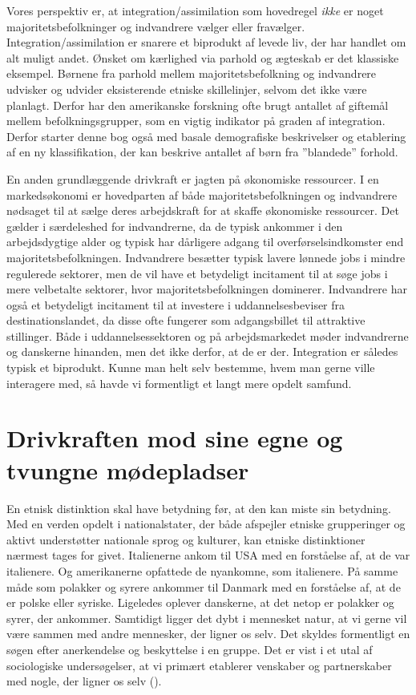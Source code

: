 \documentclass[
]{book}
\begin{document}
Vores perspektiv er, at integration/assimilation som hovedregel \emph{ikke} er noget majoritetsbefolkninger og indvandrere vælger eller fravælger. Integration/assimilation er snarere et biprodukt af levede liv, der har handlet om alt muligt andet. Ønsket om kærlighed via parhold og ægteskab er det klassiske eksempel. Børnene fra parhold mellem majoritetsbefolkning og indvandrere udvisker og udvider eksisterende etniske skillelinjer, selvom det ikke være planlagt. Derfor har den amerikanske forskning ofte brugt antallet af giftemål mellem befolkningsgrupper, som en vigtig indikator på graden af integration. Derfor starter denne bog også med basale demografiske beskrivelser og etablering af en ny klassifikation, der kan beskrive antallet af børn fra ''blandede'' forhold.

En anden grundlæggende drivkraft er jagten på økonomiske ressourcer. I en markedsøkonomi er hovedparten af både majoritetsbefolkningen og indvandrere nødsaget til at sælge deres arbejdskraft for at skaffe økonomiske ressourcer. Det gælder i særdeleshed for indvandrerne, da de typisk ankommer i den arbejdsdygtige alder og typisk har dårligere adgang til overførselsindkomster end majoritetsbefolkningen. Indvandrere besætter typisk lavere lønnede jobs i mindre regulerede sektorer, men de vil have et betydeligt incitament til at søge jobs i mere velbetalte sektorer, hvor majoritetsbefolkningen dominerer. Indvandrere har også et betydeligt incitament til at investere i uddannelsesbeviser fra destinationslandet, da disse ofte fungerer som adgangsbillet til attraktive stillinger. Både i uddannelsessektoren og på arbejdsmarkedet møder indvandrerne og danskerne hinanden, men det ikke derfor, at de er der. Integration er således typisk et biprodukt. Kunne man helt selv bestemme, hvem man gerne ville interagere med, så havde vi formentligt et langt mere opdelt samfund.

\section{Drivkraften mod sine egne og tvungne mødepladser}\label{drivkraften-mod-sine-egne-og-tvungne-muxf8depladser}

En etnisk distinktion skal have betydning før, at den kan miste sin betydning. Med en verden opdelt i nationalstater, der både afspejler etniske grupperinger og aktivt understøtter nationale sprog og kulturer, kan etniske distinktioner nærmest tages for givet. Italienerne ankom til USA med en forståelse af, at de var italienere. Og amerikanerne opfattede de nyankomne, som italienere. På samme måde som polakker og syrere ankommer til Danmark med en forståelse af, at de er polske eller syriske. Ligeledes oplever danskerne, at det netop er polakker og syrer, der ankommer. Samtidigt ligger det dybt i mennesket natur, at vi gerne vil være sammen med andre mennesker, der ligner os selv. Det skyldes formentligt en søgen efter anerkendelse og beskyttelse i en gruppe. Det er vist i et utal af sociologiske undersøgelser, at vi primært etablerer venskaber og partnerskaber med nogle, der ligner os selv ().
\end{document}
